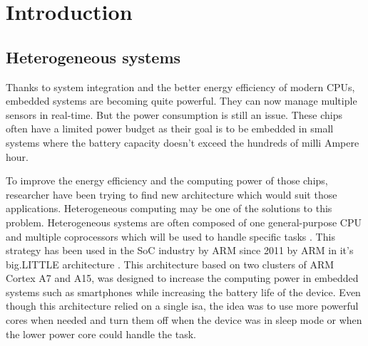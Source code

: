 
\chapter{Introduction}

\section{Heterogeneous systems}

    Thanks to system integration and the better energy efficiency of modern CPUs, embedded systems are becoming quite powerful. They can now manage multiple sensors in real-time. But the power consumption is still an issue. These chips often have a limited power budget as their goal is to be embedded in small systems where the battery capacity doesn't exceed the hundreds of milli Ampere hour. 


    To improve the energy efficiency and the computing power of those chips, researcher have been trying to find new architecture which would suit those applications. Heterogeneous computing may be one of the solutions to this problem. Heterogeneous systems are often composed of one general-purpose CPU and multiple coprocessors which will be used to handle specific tasks \cite{Web:HeteroStrat}. This strategy has been used in the SoC industry by ARM since 2011 by ARM in it's big.LITTLE architecture \cite{Art:bigLITTlE}. This architecture based on two clusters of ARM Cortex A7 and A15, was designed to increase the computing power in embedded systems such as smartphones while increasing the battery life of the device. Even though this architecture relied on a single \acrshort{isa}, the idea was to use more powerful cores when needed and turn them off when the device was in sleep mode or when the lower power core could handle the task. 


